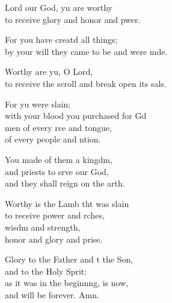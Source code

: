 \settowidth{\versewidth}{to receive the scroll and break open its seals.}
\begin{psalmverse}%
  \begin{patverse}
 Lord our God, yu are worthy\Med\\
to receive glory and honor and pwer.

For you have creatd all things;\Med\\
by your will they came to be and were mde.

Worthy are yu, O Lord,\Med\\
to receive the scroll and break open its sals.

For yu were slain;\Med\\
with your blood you purchased for Gd\\
men of every rce and tongue,\Med\\
of every people and ntion.

You made of them a kingdm,\Flex\\
and priests to srve our God,\Med\\
and they shall reign on the arth.

Worthy is the Lamb tht was slain\Med\\
to receive power and rches,\Med\\
wisdm and strength,\\
honor and glory and prise.

Glory to the Father and t the Son,\Med\\
and to the Holy Sprit:\\
as it was in the beginnng, is now,\Med\\
and will be forever. Amn.
  \end{patverse}
\end{psalmverse}
